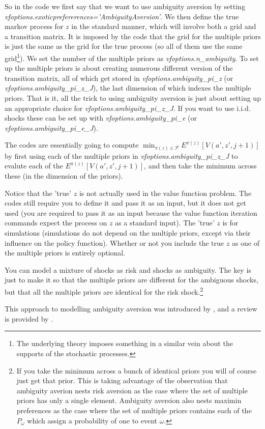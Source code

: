 So in the code we first say that we want to use ambiguity aversion by setting \\ \textit{vfoptions.exoticprefererences='AmbiguityAversion'}. We then define the true markov process for $z$ in the standard manner, which will involve both a grid and a transition matrix. It is imposed by the code that the grid for the multiple priors is just the same as the grid for the true process (so all of them use the same grid\footnote{The underlying theory imposes something in a similar vein about the supports of the stochastic processes.}). We set the number of the multiple priors as \textit{vfoptions.n\_{}ambiguity}. To set up the multiple priors is about creating numerous different version of the transition matrix, all of which get stored in \textit{vfoptions.ambiguity\_{}pi\_{}z} (or \textit{vfoptions.ambiguity\_{}pi\_{}z\_{}J}), the last dimension of which indexes the multiple priors. That is it, all the trick to using ambiguity aversion is just about setting up an appropriate choice for \textit{vfoptions.ambiguity\_{}pi\_{}z\_{}J}. If you want to use i.i.d. shocks these can be set up with \textit{vfoptions.ambiguity\_{}pi\_{}e} (or \textit{vfoptions.ambiguity\_{}pi\_{}e\_{}J}).

The codes are essentially going to compute $\min_{\pi(z) \in \mathcal{P}} E^{\pi(z)}[V(a',z',j+1)]$ by first using each of the multiple priors in \textit{vfoptions.ambiguity\_{}pi\_{}z\_{}J} to evalute each of the $E^{\pi(z)}[V(a',z',j+1)]$, and then take the minimum across these (in the dimension of the priors).

Notice that the 'true' $z$ is not actually used in the value function problem. The codes still require you to define it and pass it as an input, but it does not get used (you are required to pass it as an input because the value function iteration commands expect the process on $z$ as a standard input). The 'true' $z$ is for simulations (simulations do not depend on the multiple priors, except via their influence on the policy function). Whether or not you include the true $z$ as one of the multiple priors is entirely optional.

You can model a mixture of shocks as risk and shocks as ambiguity. The key is just to make it so that the multiple priors are different for the ambiguous shocks, but that all the multiple priors are identical for the risk shock.\footnote{If you take the minimum across a bunch of identical priors you will of course just get that prior. This is taking advantage of the observation that ambiguity averion nests risk aversion as the case where the set of multiple priors has only a single element. Ambiguity aversion also nests maximin preferences as the case where the set of multiple priors contains each of the $P_{\omega}$ which assign a probability of one to event $\omega$.}

This approach to modelling ambiguity aversion was introduced by \cite*{GilboaSchmeidler1989}, and a review is provided by \cite*{IlutSchneider2023}.


